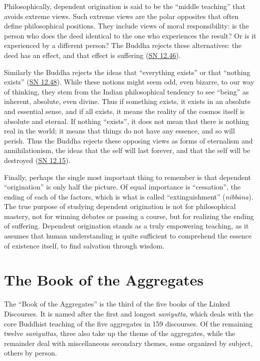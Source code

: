 \documentclass[12pt,openany]{book}%
\begin{document}
Philosophically, dependent origination is said to be the “middle teaching” that avoids extreme views. Such extreme views are the polar opposites that often define philosophical positions. They include views of moral responsibility: is the person who does the deed identical to the one who experiences the result? Or is it experienced by a different person? The Buddha rejects these alternatives: the deed has an effect, and that effect is suffering (\href{https://suttacentral.net/sn12.46}{SN 12.46}).

Similarly the Buddha rejects the ideas that “everything exists” or that “nothing exists” (\href{https://suttacentral.net/sn12.48}{SN 12.48}). While these notions might seem odd, even bizarre, to our way of thinking, they stem from the Indian philosophical tendency to see “being” as inherent, absolute, even divine. Thus if something exists, it exists in an absolute and essential sense, and if all exists, it means the reality of the cosmos itself is absolute and eternal. If nothing “exists”, it does not mean that there is nothing real in the world; it means that things do not have any essence, and so will perish. Thus the Buddha rejects these opposing views as forms of eternalism and annihilationism, the ideas that the self will last forever, and that the self will be destroyed (\href{https://suttacentral.net/sn12.15}{SN 12.15}).

Finally, perhaps the single most important thing to remember is that dependent “origination” is only half the picture. Of equal importance is “cessation”, the ending of each of the factors, which is what is called “extinguishment” (\textit{\textsanskrit{nibbāna}}). The true purpose of studying dependent origination is not for philosophical mastery, not for winning debates or passing a course, but for realizing the ending of suffering. Dependent origination stands as a truly empowering teaching, as it assumes that human understanding is quite sufficient to comprehend the essence of existence itself, to find salvation through wisdom.

\section*{The Book of the Aggregates}

The “Book of the Aggregates” is the third of the five books of the Linked Discourses. It is named after the first and longest \textit{\textsanskrit{saṁyutta}}, which deals with the core Buddhist teaching of the five aggregates in 159 discourses. Of the remaining twelve \textit{\textsanskrit{saṁyuttas}}, three also take up the theme of the aggregates, while the remainder deal with miscellaneous secondary themes, some organized by subject, others by person.
\end{document}
